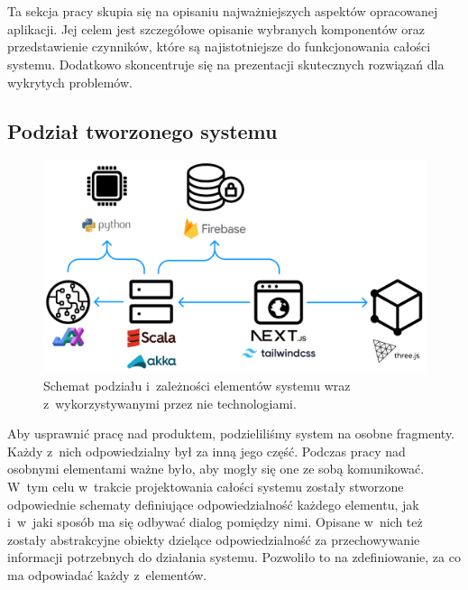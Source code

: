 \chapter{\ChapterTitleRealizationAspects}
\label{sec:wybrane-aspekty-realizacji}

Ta sekcja pracy skupia się na opisaniu najważniejszych aspektów
opracowanej aplikacji.
Jej celem jest szczegółowe opisanie wybranych
komponentów oraz przedstawienie czynników, które są najistotniejsze do
funkcjonowania całości systemu. Dodatkowo skoncentruje
się na prezentacji skutecznych rozwiązań dla wykrytych problemów.

\section{Podział tworzonego systemu}

\begin{figure}[!]
  \centering
  \includegraphics[width=\textwidth]{img/schematy/schemat_systemu.png}
  \caption{Schemat podziału i~zależności elementów systemu wraz z~wykorzystywanymi przez nie technologiami.}
  \label{fig:akka-highlevel}
\end{figure}

Aby usprawnić pracę nad produktem, podzieliliśmy system na osobne
fragmenty. Każdy z~nich odpowiedzialny był za inną jego część.
Podczas pracy nad osobnymi elementami ważne było, aby mogły się one
ze sobą komunikować. W~tym celu w~trakcie projektowania
całości systemu zostały stworzone odpowiednie schematy definiujące
odpowiedzialność każdego elementu, jak i~w~jaki sposób ma się odbywać
dialog pomiędzy nimi. Opisane w~nich też zostały abstrakcyjne
obiekty dzielące odpowiedzialność za przechowywanie informacji
potrzebnych do działania systemu. Pozwoliło to na zdefiniowanie,
za co ma odpowiadać każdy z~elementów.

